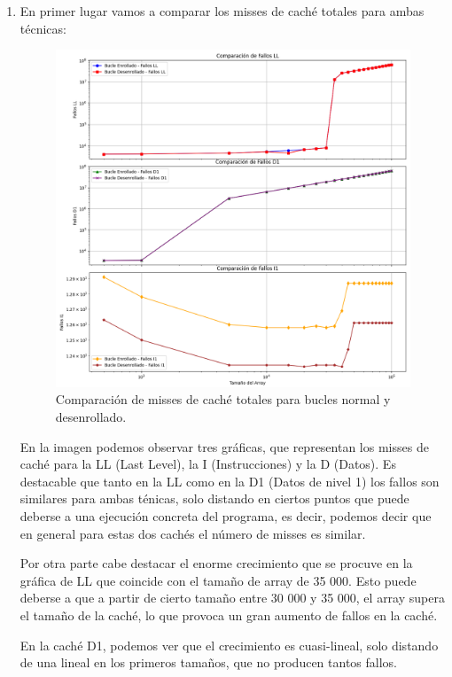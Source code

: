 \documentclass[a4paper,twocolumn]{article}
\begin{document}
\begin{enumerate}
    \item En primer lugar vamos a comparar los misses de caché totales para ambas técnicas:
    \begin{figure}[H]
        \centering
        \includegraphics[width=\columnwidth]{img/numberMisses.png}
        \caption{Comparación de misses de caché totales para bucles normal y desenrollado.}
        \label{fig:real_vs_cpu_time}
    \end{figure}
    
    En la imagen podemos observar tres gráficas, que representan los misses de caché para la LL (Last Level), la I (Instrucciones) y la D (Datos). Es destacable que tanto en la LL como en la D1 (Datos de nivel 1) los fallos son similares para ambas ténicas, solo distando en ciertos puntos que puede deberse a una ejecución concreta del programa, es decir, podemos decir que en general para estas dos cachés el número de misses es similar.

    Por otra parte cabe destacar el enorme crecimiento que se procuve en la gráfica de LL que coincide con el tamaño de array de 35 000. Esto puede deberse a que a partir de cierto tamaño entre 30 000 y 35 000, el array supera el tamaño de la caché, lo que provoca un gran aumento de fallos en la caché. 

    En la caché D1, podemos ver que el crecimiento es cuasi-lineal, solo distando de una lineal en los primeros tamaños, que no producen tantos fallos. 


\end{enumerate}
\end{document}
